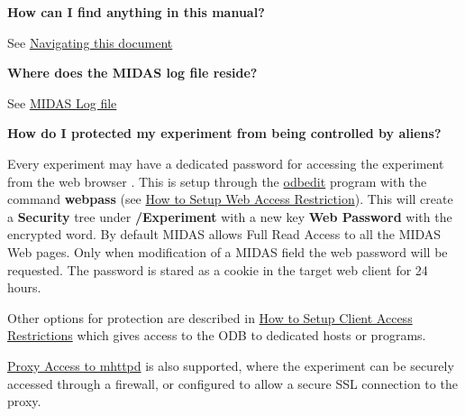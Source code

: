\begin{DoxyEnumerate}
\item {\bfseries  How can I find anything in this manual? }
\begin{DoxyItemize}
\item See \hyperlink{Convention_C_Navigation}{Navigating this document}
\end{DoxyItemize}


\item {\bfseries  Where does the MIDAS log file reside?}
\begin{DoxyItemize}
\item See \hyperlink{F_Messaging_F_Log_File}{MIDAS Log file}
\end{DoxyItemize}


\item {\bfseries  How do I protected my experiment from being controlled by aliens?}


\begin{DoxyItemize}
\item Every experiment may have a dedicated password for accessing the experiment from the web browser . This is setup through the \hyperlink{RC_odbedit_utility}{odbedit} program with the command {\bfseries webpass} (see \hyperlink{RC_customize_ODB_RC_Setup_Web_Security}{How to Setup Web Access Restriction}). This will create a {\bfseries Security} tree under {\bfseries /Experiment} with a new key {\bfseries  Web Password} with the encrypted word. By default MIDAS allows Full Read Access to all the MIDAS Web pages. Only when modification of a MIDAS field the web password will be requested. The password is stared as a cookie in the target web client for 24 hours.
\end{DoxyItemize}


\begin{DoxyItemize}
\item Other options for protection are described in \hyperlink{RC_customize_ODB_RC_Setup_Security}{How to Setup Client Access Restrictions} which gives access to the ODB to dedicated hosts or programs.
\end{DoxyItemize}


\begin{DoxyItemize}
\item \hyperlink{RC_mhttpd_utility_RC_mhttpd_proxy}{Proxy Access to mhttpd} is also supported, where the experiment can be securely accessed through a firewall, or configured to allow a secure SSL connection to the proxy.
\end{DoxyItemize}



\end{DoxyEnumerate}
